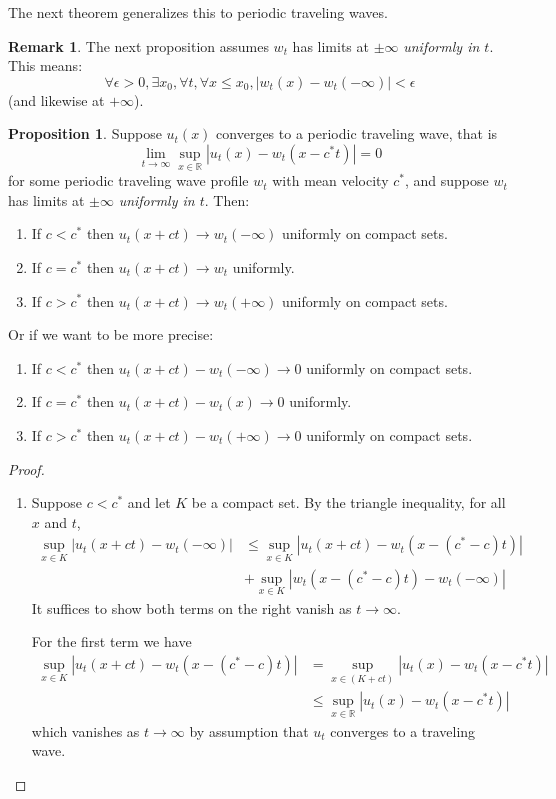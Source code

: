 \documentclass{article}
\theoremstyle{definition}
\newtheorem{proposition}[theorem]{Proposition}
\newtheorem{remark}[theorem]{Remark}
\numberwithin{equation}{section}
\begin{document}
The next theorem generalizes this to periodic traveling waves.


\begin{remark}
The next proposition assumes $w_t$ has limits at $\pm\infty$ {\it uniformly in $t$}. This means:
$$
\forall \epsilon>0,\exists x_0,\forall t,\forall x\leq x_0,|w_t(x)-w_t(-\infty)|<\epsilon
$$
(and likewise at $+\infty$).
\end{remark}

\begin{proposition}
Suppose $u_t(x)$ converges to a periodic traveling wave, that is
$$ \lim_{t\to\infty}\sup_{x \in \mathbb{R}}|u_t(x)-w_t(x-c^*t)|=0 $$
for some periodic traveling wave profile $w_t$ with mean velocity $c^*$, and suppose $w_t$ has limits at $\pm\infty$ {\it uniformly in $t$}. Then:
\begin{enumerate}
\item If $c<c^*$ then $u_t(x+ct) \to w_t(-\infty)$ uniformly on compact sets.
\item If $c=c^*$ then $u_t(x+ct) \to w_t$ uniformly.
\item If $c>c^*$ then $u_t(x+ct) \to w_t(+\infty)$ uniformly on compact sets.
\end{enumerate}
Or if we want to be more precise:
\begin{enumerate}
\item If $c<c^*$ then $u_t(x+ct)-w_t(-\infty) \to 0$ uniformly on compact sets.
\item If $c=c^*$ then $u_t(x+ct)-w_t(x) \to 0$ uniformly.
\item If $c>c^*$ then $u_t(x+ct)-w_t(+\infty) \to 0$ uniformly on compact sets.
\end{enumerate}
\begin{proof}
\begin{enumerate}
\item Suppose $c<c^*$ and let $K$ be a compact set. By the triangle inequality, for all $x$ and $t$,
$$ \begin{aligned}
\sup_{x \in K} |u_t(x+ct)-w_t(-\infty)| &\leq \sup_{x \in K} |u_t(x+ct)-w_t(x-(c^*-c)t)| \\
& + \sup_{x \in K}|w_t(x-(c^*-c)t)-w_t(-\infty)|
\end{aligned} $$
It suffices to show both terms on the right vanish as $t \to \infty$.

For the first term we have
$$ \begin{aligned} \sup_{x \in K} |u_t(x+ct)-w_t(x-(c^*-c)t)| &= \sup_{x \in (K+ct)}|u_t(x)-w_t(x-c^*t)| \\
&\leq \sup_{x \in \mathbb{R}}|u_t(x)-w_t(x-c^*t)|
\end{aligned} $$
which vanishes as $t \to \infty$ by assumption that $u_t$ converges to a traveling wave.


\end{enumerate}
\end{proof}
\end{proposition}
\end{document}
